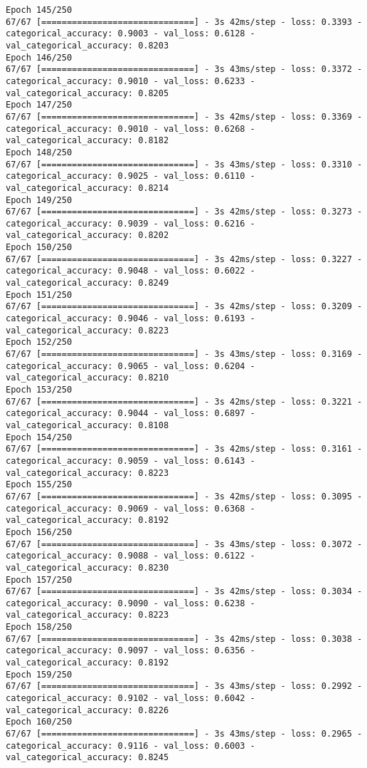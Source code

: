 \begin{lstlisting}
Epoch 145/250
67/67 [==============================] - 3s 42ms/step - loss: 0.3393 - categorical_accuracy: 0.9003 - val_loss: 0.6128 - val_categorical_accuracy: 0.8203
Epoch 146/250
67/67 [==============================] - 3s 43ms/step - loss: 0.3372 - categorical_accuracy: 0.9010 - val_loss: 0.6233 - val_categorical_accuracy: 0.8205
Epoch 147/250
67/67 [==============================] - 3s 42ms/step - loss: 0.3369 - categorical_accuracy: 0.9010 - val_loss: 0.6268 - val_categorical_accuracy: 0.8182
Epoch 148/250
67/67 [==============================] - 3s 43ms/step - loss: 0.3310 - categorical_accuracy: 0.9025 - val_loss: 0.6110 - val_categorical_accuracy: 0.8214
Epoch 149/250
67/67 [==============================] - 3s 42ms/step - loss: 0.3273 - categorical_accuracy: 0.9039 - val_loss: 0.6216 - val_categorical_accuracy: 0.8202
Epoch 150/250
67/67 [==============================] - 3s 42ms/step - loss: 0.3227 - categorical_accuracy: 0.9048 - val_loss: 0.6022 - val_categorical_accuracy: 0.8249
Epoch 151/250
67/67 [==============================] - 3s 42ms/step - loss: 0.3209 - categorical_accuracy: 0.9046 - val_loss: 0.6193 - val_categorical_accuracy: 0.8223
Epoch 152/250
67/67 [==============================] - 3s 43ms/step - loss: 0.3169 - categorical_accuracy: 0.9065 - val_loss: 0.6204 - val_categorical_accuracy: 0.8210
Epoch 153/250
67/67 [==============================] - 3s 42ms/step - loss: 0.3221 - categorical_accuracy: 0.9044 - val_loss: 0.6897 - val_categorical_accuracy: 0.8108
Epoch 154/250
67/67 [==============================] - 3s 42ms/step - loss: 0.3161 - categorical_accuracy: 0.9059 - val_loss: 0.6143 - val_categorical_accuracy: 0.8223
Epoch 155/250
67/67 [==============================] - 3s 42ms/step - loss: 0.3095 - categorical_accuracy: 0.9069 - val_loss: 0.6368 - val_categorical_accuracy: 0.8192
Epoch 156/250
67/67 [==============================] - 3s 43ms/step - loss: 0.3072 - categorical_accuracy: 0.9088 - val_loss: 0.6122 - val_categorical_accuracy: 0.8230
Epoch 157/250
67/67 [==============================] - 3s 42ms/step - loss: 0.3034 - categorical_accuracy: 0.9090 - val_loss: 0.6238 - val_categorical_accuracy: 0.8223
Epoch 158/250
67/67 [==============================] - 3s 42ms/step - loss: 0.3038 - categorical_accuracy: 0.9097 - val_loss: 0.6356 - val_categorical_accuracy: 0.8192
Epoch 159/250
67/67 [==============================] - 3s 43ms/step - loss: 0.2992 - categorical_accuracy: 0.9102 - val_loss: 0.6042 - val_categorical_accuracy: 0.8226
Epoch 160/250
67/67 [==============================] - 3s 43ms/step - loss: 0.2965 - categorical_accuracy: 0.9116 - val_loss: 0.6003 - val_categorical_accuracy: 0.8245

\end{lstlisting}
